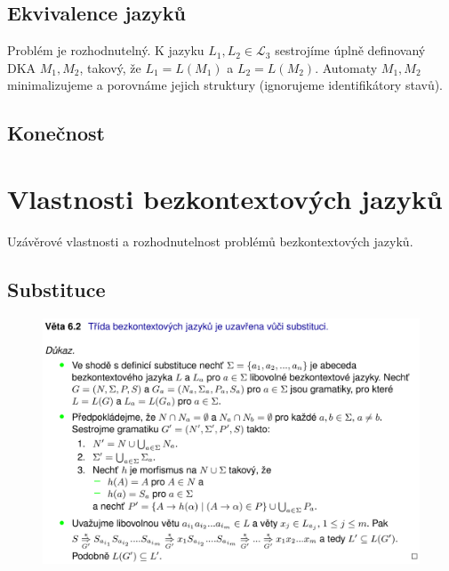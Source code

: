 \subsection{Ekvivalence jazyků}

Problém je rozhodnutelný. K jazyku $L_1, L_2 \in \mathcal{L}_3$ sestrojíme úplně definovaný DKA $M_1, M_2$, takový, že $L_1 = L(M_1)$ a $L_2 = L(M_2)$. Automaty $M_1, M_2$ minimalizujeme a porovnáme jejich struktury (ignorujeme identifikátory stavů).

\subsection{Konečnost}

\begin{compactitem}
    \item {}
\end{compactitem}


\section{Vlastnosti bezkontextových jazyků}

Uzávěrové vlastnosti a rozhodnutelnost problémů bezkontextových jazyků.

\subsection{Substituce}

\begin{figure}[H]
    \centering
    \includegraphics[width=1\linewidth]{uzaverove_vlastnosti_L2_01.pdf}
\end{figure}

